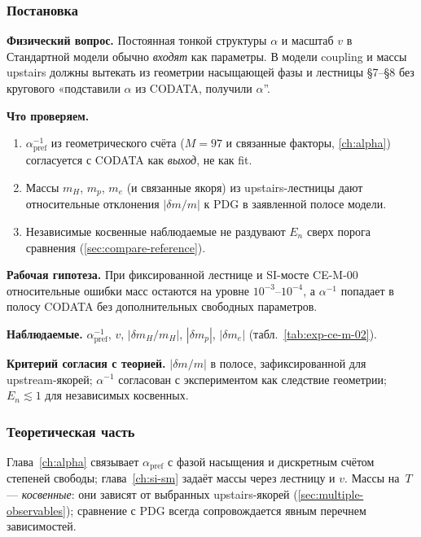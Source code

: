 \label{exp:cem02}

\subsubsection*{Постановка}
\textbf{Физический вопрос.}
Постоянная тонкой структуры $\alpha$ и масштаб $v$ в Стандартной модели обычно \emph{входят} как параметры.
В модели coupling и массы upstairs должны вытекать из геометрии насыщающей фазы и лестницы §7--§8 без кругового «подставили $\alpha$ из CODATA, получили $\alpha$''.

\textbf{Что проверяем.}
\begin{enumerate}[label=\textbf{(\alph*)},leftmargin=*,itemsep=0.25em]
\item $\alpha^{-1}_{\mathrm{pref}}$ из геометрического счёта ($M=97$ и связанные факторы, \cref{ch:alpha}) согласуется с CODATA как \emph{выход}, не как fit.
\item Массы $m_H$, $m_p$, $m_e$ (и связанные якоря) из upstairs-лестницы дают относительные отклонения $|\delta m/m|$ к PDG в заявленной полосе модели.
\item Независимые косвенные наблюдаемые не раздувают $E_n$ сверх порога сравнения (\cref{sec:compare-reference}).
\end{enumerate}

\textbf{Рабочая гипотеза.}
При фиксированной лестнице и SI-мосте CE-M-00 относительные ошибки масс остаются на уровне $10^{-3}$--$10^{-4}$, а $\alpha^{-1}$ попадает в полосу CODATA без дополнительных свободных параметров.

\textbf{Наблюдаемые.}
$\alpha^{-1}_{\mathrm{pref}}$, $v$, $|\delta m_H/m_H|$, $|\delta m_p|$, $|\delta m_e|$ (табл.~\ref{tab:exp-ce-m-02}).

\textbf{Критерий согласия с теорией.}
$|\delta m/m|$ в полосе, зафиксированной для upstream-якорей; $\alpha^{-1}$ согласован с экспериментом как следствие геометрии; $E_n\lesssim 1$ для независимых косвенных.

\subsubsection*{Теоретическая часть}
Глава~\cref{ch:alpha} связывает $\alpha_{\mathrm{pref}}$ с фазой насыщения и дискретным счётом степеней свободы; глава~\cref{ch:si-sm} задаёт массы через лестницу и $v$.
Массы на~$T$ --- \emph{косвенные}: они зависят от выбранных upstairs-якорей (\cref{sec:multiple-observables}); сравнение с PDG всегда сопровождается явным перечнем зависимостей.

